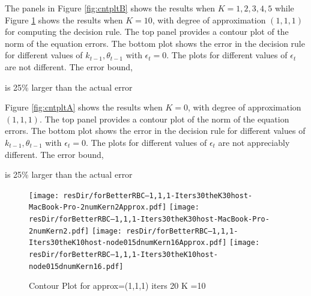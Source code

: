 \documentclass[12pt]{article}
\begin{document}
The panels in Figure \ref{fig:cntpltB} shows the results when $K=1,2,3,4,5$
while 
Figure \ref{fig:cntpltC} shows the results when $K=10$, with degree of approximation $(1,1,1)$
for computing the decision rule.  The top panel provides a contour plot of the
norm of the equation errors. The bottom plot shows the error in the decision rule for different values of $k_{t-1}, \theta_{t-1}$ with $\epsilon_t=0$.  The plots for different values of $\epsilon_t$ are not different.  The error bound, 
\ifmacosx
 
\fi
is 25\% larger than the actual error 
\iflinux
% 
\fi






Figure \ref{fig:cntpltA} shows the results when $K=0$, with degree of approximation $(1,1,1)$.  The top panel provides a contour plot of the
norm of the equation errors. The bottom plot shows the error in the decision rule for different values of $k_{t-1}, \theta_{t-1}$ with $\epsilon_t=0$.  The plots for different values of $\epsilon_t$ are not appreciably different. The error bound, 
\ifmacosx
 
\fi
\iflinux
 
\fi
is 25\% larger than the actual error 
\ifmacosx

\fi
\iflinux

\fi



\begin{figure}
  \centering
\ifmacosx
  \texttt{[image: resDir/forBetterRBC--1,1,1-Iters30theK30host-MacBook-Pro-2numKern2Approx.pdf]}
  \texttt{[image: resDir/forBetterRBC--1,1,1-Iters30theK30host-MacBook-Pro-2numKern2.pdf]}
\fi
\iflinux
  \texttt{[image: resDir/forBetterRBC--1,1,1-Iters30theK10host-node015dnumKern16Approx.pdf]}
  \texttt{[image: resDir/forBetterRBC--1,1,1-Iters30theK10host-node015dnumKern16.pdf]}
\fi
  \caption{Contour Plot for approx=(1,1,1) iters 20 K =10}
  \label{fig:cntpltC}
\end{figure}
\end{document}
